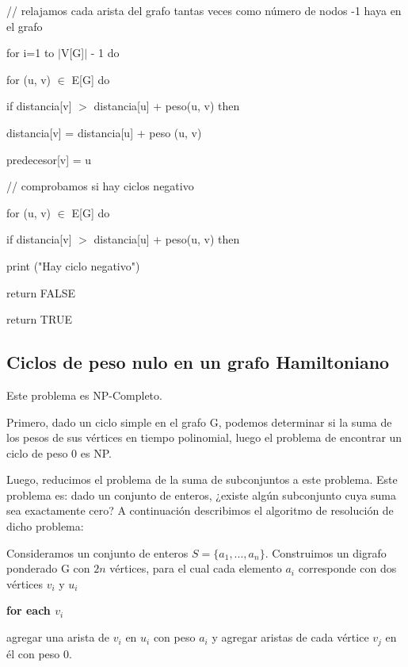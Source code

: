 \documentclass[a4paper,10pt]{article}
\begin{document}
\bigskip
\quad       // relajamos cada arista del grafo tantas veces como número de nodos -1 haya en el grafo
       
\quad for i=1 to \(|\)V[G]\(|\) - 1 do
       
\quad\quad for (u, v) \(\in\)  E[G] do
       
\quad\quad\quad if distancia[v] \(>\) distancia[u] + peso(u, v) then
       
\quad\quad\quad\quad distancia[v] = distancia[u] + peso (u, v)
       
\quad\quad\quad\quad predecesor[v] = u

\bigskip       
\quad // comprobamos si hay ciclos negativo
       
\quad for (u, v) \(\in\) E[G] do
       
\quad\quad if distancia[v] \(>\) distancia[u] + peso(u, v) then
       
\quad\quad\quad print ("Hay ciclo negativo")
       
\quad\quad\quad return FALSE

\bigskip       
\quad return TRUE


\subsection{Ciclos de peso nulo en un grafo Hamiltoniano}

Este problema es NP-Completo.
 
Primero, dado un ciclo simple en el grafo G, podemos determinar si la suma de los pesos de sus vértices en tiempo polinomial, luego el problema de encontrar un ciclo de peso 0 es NP.

Luego, reducimos el problema de la suma de subconjuntos a este problema. Este problema es: dado un conjunto de enteros, ¿existe algún subconjunto cuya suma sea exactamente cero? A continuación describimos el algoritmo de resolución de dicho problema:

\bigskip

Consideramos un conjunto de enteros \( S = \{ a_{1}, . . . , a_{n} \}  \). Construimos un digrafo ponderado G con \( 2n \) vértices, para el cual cada elemento \( a_{i} \) corresponde con dos vértices \( v_{i} \) y \( u_{i} \)

\textbf{\textcolor[rgb]{0.0,0.5019608,0.0}{for each }}\( v_{i} \)

\quad agregar una arista de \( v_{i} \) en \( u_{i} \) con peso \( a_{i} \) y agregar aristas de cada vértice \( v_{j} \) en él con peso 0.
\end{document}
